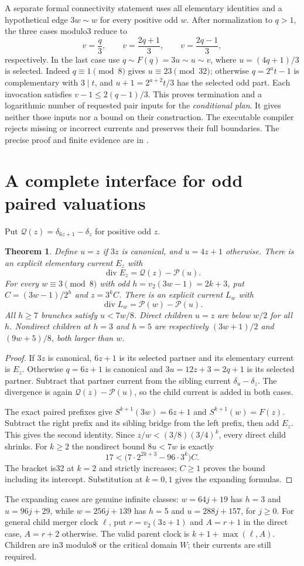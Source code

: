 \documentclass[11pt]{article}
\newtheorem{theorem}{Theorem}
\begin{document}
A separate formal connectivity statement uses all elementary identities
and a hypothetical edge $3w\sim w$ for every positive odd $w$.
After normalization to $q>1$, the three cases modulo3 reduce to
\[
 v=\frac q3,\qquad v=\frac{2q+1}3,\qquad
 v=\frac{2q-1}3,
\]
respectively. In the last case use
$q\sim F(q)=3u\sim u\sim v$, where $u=(4q+1)/3$ is selected.
Indeed $q\equiv1\pmod8$ gives $u\equiv23\pmod{32}$;
otherwise $q=2^at-1$ is complementary with $3\mid t$, and
$u+1=2^{a+2}t/3$ has the selected odd part.
Each invocation satisfies $v-1\le2(q-1)/3$. This proves termination
and a logarithmic number of requested pair inputs for the
\emph{conditional plan}. It gives neither those inputs nor a bound
on their construction. The executable compiler rejects missing or
incorrect currents and preserves their full boundaries. The precise
proof and finite evidence are in
.

\section{A complete interface for odd paired valuations}
Put $\mathcal Q(z)=\delta_{6z+1}-\delta_z$ for positive odd $z$.
\begin{theorem}\label{thm:oddinterface}
Define $u=z$ if $3z$ is canonical, and $u=4z+1$ otherwise.
There is an explicit elementary current $E_z$ with
\[
 \operatorname{div}E_z=\mathcal Q(z)-\mathcal P(u).
\]
For every $w\equiv3\pmod8$ with odd $h=v_2(3w-1)=2k+3$,
put $C=(3w-1)/2^h$ and $z=3^kC$. There is an explicit current
$L_w$ with
\[
 \operatorname{div}L_w=\mathcal P(w)-\mathcal P(u).
\]
All $h\ge7$ branches satisfy $u<7w/8$. Direct children $u=z$
are below $w/2$ for all $h$. Nondirect children at $h=3$ and $h=5$
are respectively $(3w+1)/2$ and $(9w+5)/8$, both larger than $w$.
\end{theorem}
\begin{proof}
If $3z$ is canonical, $6z+1$ is its selected partner and its
elementary current is $E_z$. Otherwise $q=6z+1$ is canonical
and $3u=12z+3=2q+1$ is its selected partner. Subtract that
partner current from the sibling current $\delta_u-\delta_z$.
The divergence is again $\mathcal Q(z)-\mathcal P(u)$, so the
child current is added in both cases.

The exact paired prefixes give
$S^{k+1}(3w)=6z+1$ and $S^{k+1}(w)=F(z)$.
Subtract the right prefix and its sibling bridge from the left prefix,
then add $E_z$. This gives the second identity.
Since $z/w<(3/8)(3/4)^k$, every direct child shrinks.
For $k\ge2$ the nondirect bound $8u<7w$ is exactly
\[
 17<\bigl(7\cdot2^{2k+3}-96\cdot3^k\bigr)C.
\]
The bracket is32 at $k=2$ and strictly increases; $C\ge1$ proves
the bound including its intercept. Substitution at $k=0,1$ gives
the expanding formulas.
\end{proof}
The expanding cases are genuine infinite classes:
$w=64j+19$ has $h=3$ and $u=96j+29$, while
$w=256j+139$ has $h=5$ and $u=288j+157$, for $j\ge0$.
For general child merger clock $\ell$, put $r=v_2(3z+1)$ and
$A=r+1$ in the direct case, $A=r+2$ otherwise. The valid parent
clock is $k+1+\max(\ell,A)$. Children are in3 modulo8 or the
critical domain $W$; their currents are still required.
\end{document}
